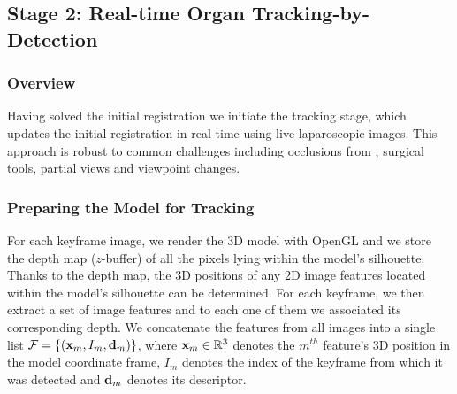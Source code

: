 
\subsection{Stage 2: Real-time Organ Tracking-by-Detection}
\label{sec:updateRegistration}
\subsubsection{Overview}
Having solved the initial registration we initiate the tracking stage, which updates the initial registration in real-time using live laparoscopic images. %
This approach is robust to common challenges including occlusions from \eg, surgical tools, partial views and viewpoint changes.


\subsubsection{Preparing the Model for Tracking}
\label{sec:preparing}
For each keyframe image, we render the 3D model with OpenGL and we store the depth map ($z$-buffer) of all the pixels lying within the model's silhouette. %
Thanks to the depth map, the 3D positions of any 2D image features located within the model's silhouette can be determined.
For each keyframe, we then extract a set of image features and to each one of them we associated its corresponding depth. 
We concatenate the features from all images into a single list $\mathcal{F}=\{(\mathbf{x}_{m},I_{m},\mathbf{d}_{m})\}$, where $\mathbf{x}_{m} \in \mathbb{R}^3$ denotes the $m^{th}$ feature's 3D position in the model coordinate frame, $I_{m}$ denotes the index of the keyframe from which it was detected and $\mathbf{d}_{m}$ denotes its descriptor.

